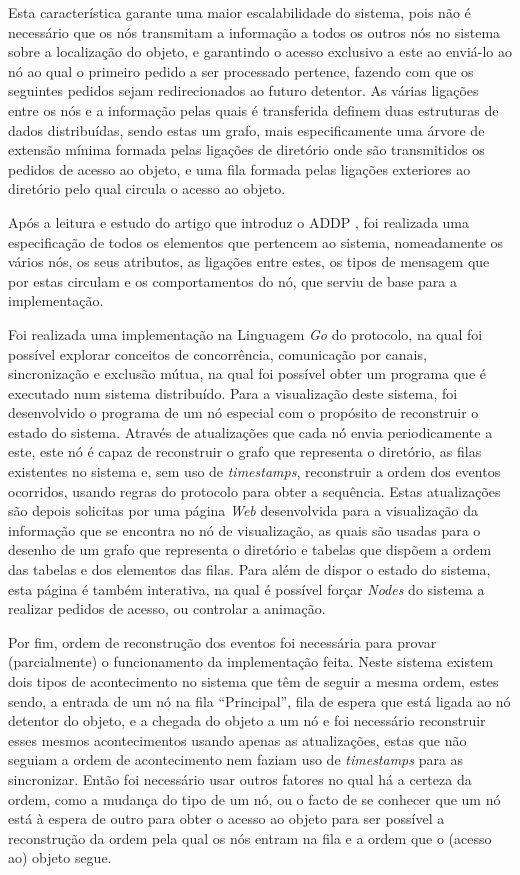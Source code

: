 Esta característica garante uma maior escalabilidade do sistema, pois não é necessário que os nós transmitam a informação a todos os outros nós no sistema sobre a localização
do objeto, e garantindo o acesso exclusivo a este ao enviá-lo ao nó ao qual o primeiro pedido a ser processado pertence, fazendo com que os seguintes pedidos sejam redirecionados
ao futuro detentor.
As várias ligações entre os nós e a informação pelas quais é transferida definem duas estruturas de dados distribuídas, sendo estas um grafo, mais especificamente uma árvore de extensão mínima
formada pelas ligações de diretório onde são transmitidos os pedidos de acesso ao objeto, e uma fila formada pelas ligações exteriores ao diretório pelo qual circula o acesso ao objeto.

Após a leitura e estudo do artigo que introduz o \acs{ADDP} \cite{Arrow}, foi realizada uma especificação de todos os elementos que pertencem ao sistema, nomeadamente os vários nós, os seus atributos,
as ligações entre estes, os tipos de mensagem que por estas circulam e os comportamentos do nó, que serviu de base para a implementação. 

Foi realizada uma implementação na Linguagem \emph{Go} do protocolo, na qual foi possível explorar conceitos de concorrência, comunicação por canais, sincronização e exclusão mútua,
na qual foi possível obter um programa que é executado num sistema distribuído. 
Para a visualização deste sistema, foi desenvolvido o programa de um nó especial com o propósito de reconstruir o estado do sistema. 
Através de atualizações que cada nó envia periodicamente a este, este nó é capaz de reconstruir o grafo que representa o diretório, as filas existentes no sistema e, sem uso de \emph{timestamps},
reconstruir a ordem dos eventos ocorridos, usando regras do protocolo para obter a sequência. 
Estas atualizações são depois solicitas por uma página \emph{Web} desenvolvida para a visualização da informação que se encontra no nó de visualização, as quais são usadas para
o desenho de um grafo que representa o diretório e tabelas que dispõem a ordem das tabelas e dos elementos das filas. 
Para além de dispor o estado do sistema, esta página é também interativa, na qual é possível forçar \emph{Nodes} do sistema a realizar pedidos de acesso, ou controlar a animação.

Por fim, ordem de reconstrução dos eventos foi necessária para provar (parcialmente) o funcionamento da implementação feita.
Neste sistema existem dois tipos de acontecimento no sistema que têm de seguir a mesma ordem, estes sendo,
a entrada de um nó na fila ``Principal'', fila de espera que está ligada ao nó detentor do objeto, e a chegada do objeto a um nó e foi necessário
reconstruir esses mesmos acontecimentos usando apenas as atualizações, estas que não seguiam a ordem de acontecimento nem faziam uso de \emph{timestamps} para as sincronizar. 
Então foi necessário usar outros fatores no qual há a certeza da ordem, como a mudança do tipo de um nó, ou o facto de se conhecer que um nó está à espera de outro para obter o acesso
ao objeto para ser possível a reconstrução da ordem pela qual os nós entram na fila e a ordem que o (acesso ao) objeto segue.


